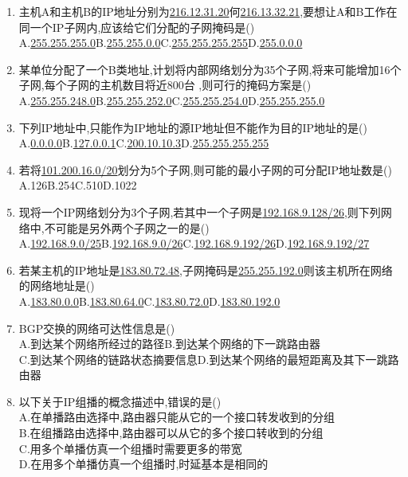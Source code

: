 \documentclass[12pt, a4paper, oneside, UTF8]{ctexbook}
\begin{document}
\begin{enumerate}
    \item 主机A和主机B的IP地址分别为\underline{216.12.31.20}何\underline{216.13.32.21},要想让A和B工作在
    同一个IP子网内,应该给它们分配的子网掩码是() \\
    A.\underline{255.255.255.0}\qquad B.\underline{255.255.0.0}\qquad C.\underline{255.255.255.255}\qquad D.\underline{255.0.0.0}

    \item 某单位分配了一个B类地址,计划将内部网络划分为35个子网,将来可能增加16个子网,每个子网的主机数目将近800台
    ,则可行的掩码方案是() \\
    A.\underline{255.255.248.0}\qquad B.\underline{255.255.252.0}\qquad C.\underline{255.255.254.0}\qquad D.\underline{255.255.255.0}

    \item 下列IP地址中,只能作为IP地址的源IP地址但不能作为目的IP地址的是() \\
    A.\underline{0.0.0.0}\qquad B.\underline{127.0.0.1}\qquad C.\underline{200.10.10.3}\qquad D.\underline{255.255.255.255}

    \item 若将\underline{101.200.16.0/20}划分为5个子网,则可能的最小子网的可分配IP地址数是() \\
    A.126\qquad B.254\qquad C.510\qquad D.1022

    \item 现将一个IP网络划分为3个子网,若其中一个子网是\underline{192.168.9.128/26},则下列网络中,不可能是另外两个子网之一的是() \\
    A.\underline{192.168.9.0/25}\quad B.\underline{192.168.9.0/26}\quad C.\underline{192.168.9.192/26}\quad D.\underline{192.168.9.192/27}

    \item 若某主机的IP地址是\underline{183.80.72.48},子网掩码是\underline{255.255.192.0}则该主机所在网络的网络地址是() \\
    A.\underline{183.80.0.0}\qquad B.\underline{183.80.64.0}\qquad C.\underline{183.80.72.0}\qquad D.\underline{183.80.192.0}

    \item BGP交换的网络可达性信息是() \\
    A.到达某个网络所经过的路径\qquad B.到达某个网络的下一跳路由器 \\
    C.到达某个网络的链路状态摘要信息\quad D.到达某个网络的最短距离及其下一跳路由器

    \item 以下关于IP组播的概念描述中,错误的是() \\
    A.在单播路由选择中,路由器只能从它的一个接口转发收到的分组 \\
    B.在组播路由选择中,路由器可以从它的多个接口转收到的分组 \\
    C.用多个单播仿真一个组播时需要更多的带宽 \\
    D.在用多个单播仿真一个组播时,时延基本是相同的


\end{enumerate}
\end{document}
